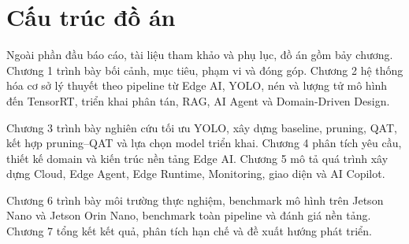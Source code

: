 \section{Cấu trúc đồ án}

Ngoài phần đầu báo cáo, tài liệu tham khảo và phụ lục, đồ án gồm bảy chương.
Chương 1 trình bày bối cảnh, mục tiêu, phạm vi và đóng góp. Chương 2 hệ thống
hóa cơ sở lý thuyết theo pipeline từ Edge AI, YOLO, nén và lượng tử mô hình đến
TensorRT, triển khai phân tán, RAG, AI Agent và Domain-Driven Design.

Chương 3 trình bày nghiên cứu tối ưu YOLO, xây dựng baseline, pruning, QAT,
kết hợp pruning--QAT và lựa chọn model triển khai. Chương 4 phân tích yêu cầu,
thiết kế domain và kiến trúc nền tảng Edge AI. Chương 5 mô tả quá trình xây dựng
Cloud, Edge Agent, Edge Runtime, Monitoring, giao diện và AI Copilot.

Chương 6 trình bày môi trường thực nghiệm, benchmark mô hình trên Jetson Nano
và Jetson Orin Nano, benchmark toàn pipeline và đánh giá nền tảng. Chương 7 tổng
kết kết quả, phân tích hạn chế và đề xuất hướng phát triển.